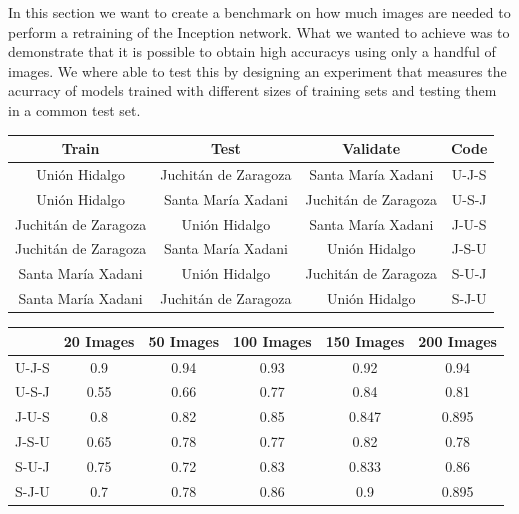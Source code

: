 In this section we want to create a benchmark on how much images are needed to perform a retraining of the Inception network. What we wanted to achieve was to demonstrate that it is possible to obtain high accuracys using only a handful of images. We where able to test this by designing an experiment that measures the acurracy of models trained with different sizes of training sets and testing them in a common test set. 


\begin{center}
  \begin{tabular}{|c|c|c|c|}
    \hline
    Train                  &Test                   &Validate               & Code \\ \hline
    Uni\'on Hidalgo        &Juchit\'an de Zaragoza &Santa Mar\'ia Xadani   &U-J-S \\ \hline
    Uni\'on Hidalgo        &Santa Mar\'ia Xadani   &Juchit\'an de Zaragoza &U-S-J \\ \hline
    Juchit\'an de Zaragoza &Uni\'on Hidalgo        &Santa Mar\'ia Xadani   &J-U-S \\ \hline
    Juchit\'an de Zaragoza &Santa Mar\'ia Xadani   &Uni\'on Hidalgo        &J-S-U \\ \hline
    Santa Mar\'ia Xadani   &Uni\'on Hidalgo        &Juchit\'an de Zaragoza &S-U-J \\ \hline
    Santa Mar\'ia Xadani   &Juchit\'an de Zaragoza &Uni\'on Hidalgo        &S-J-U \\ 
    \hline
  \end{tabular}
\end{center}


\begin{center}
  \begin{tabular}{|c|c|c|c|c|c|}
    \hline
         &20 Images &50 Images &100 Images&150 Images&200 Images\\ \hline
    U-J-S&0.9 &0.94&0.93&0.92 &0.94  \\ \hline
    U-S-J&0.55&0.66&0.77&0.84 &0.81  \\ \hline
    J-U-S&0.8 &0.82&0.85&0.847&0.895 \\ \hline
    J-S-U&0.65&0.78&0.77&0.82 &0.78  \\ \hline
    S-U-J&0.75&0.72&0.83&0.833&0.86  \\ \hline
    S-J-U&0.7 &0.78&0.86&0.9  &0.895 \\ 
    \hline
  \end{tabular}
\end{center}

